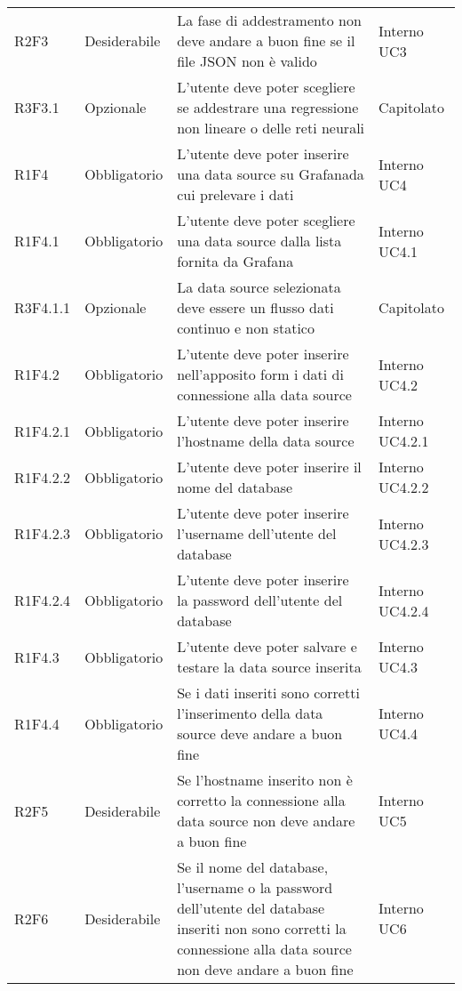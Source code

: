 \begin{longtable} {
		>{}p{24mm} 
		>{}p{32mm}
		>{}p{40mm} 
		>{}p{24.5mm}
		}
		R2F3 & Desiderabile & La fase di addestramento non deve andare a buon fine se il file JSON non è valido & Interno UC3 \TBstrut \\ [2mm]
		R3F3.1 & Opzionale & L'utente deve poter scegliere se addestrare una regressione non lineare o delle reti neurali\glo & Capitolato \TBstrut \\ [2mm]
		R1F4 & Obbligatorio & L'utente deve poter inserire una data source su Grafana\glosp da cui prelevare i dati & Interno UC4 \TBstrut \\ [2mm]
		R1F4.1 & Obbligatorio & L'utente deve poter scegliere una data source dalla lista fornita da Grafana\glo & Interno UC4.1 \TBstrut \\ [2mm]
		R3F4.1.1 & Opzionale & La data source selezionata deve essere un flusso dati continuo e non statico & Capitolato \TBstrut \\ [2mm]
        R1F4.2 & Obbligatorio & L'utente deve poter inserire nell'apposito form i dati di connessione alla data source & Interno UC4.2 \TBstrut \\ [2mm]
		R1F4.2.1 & Obbligatorio & L'utente deve poter inserire l'hostname della data source & Interno UC4.2.1 \TBstrut \\ [2mm]
		R1F4.2.2 & Obbligatorio & L'utente deve poter inserire il nome del database & Interno UC4.2.2 \TBstrut \\ [2mm]
        R1F4.2.3 & Obbligatorio & L'utente deve poter inserire l'username dell'utente del database & Interno UC4.2.3 \TBstrut \\ [2mm]
        R1F4.2.4 & Obbligatorio & L'utente deve poter inserire la password dell'utente del database & Interno UC4.2.4 \TBstrut \\ [2mm]
		R1F4.3 & Obbligatorio & L'utente deve poter salvare e testare la data source inserita & Interno UC4.3 \TBstrut \\ [2mm]
		R1F4.4 & Obbligatorio & Se i dati inseriti sono corretti l'inserimento della data source deve andare a buon fine & Interno UC4.4 \TBstrut \\ [2mm]
        R2F5 & Desiderabile & Se l'hostname inserito non è corretto la connessione alla data source non deve andare a buon fine & Interno UC5 \TBstrut \\ [2mm]
		R2F6 & Desiderabile & Se il nome del database, l'username o la password dell'utente del database inseriti non sono corretti la connessione alla data source non deve andare a buon fine & Interno UC6 \TBstrut \\ [2mm]
	\end{longtable}